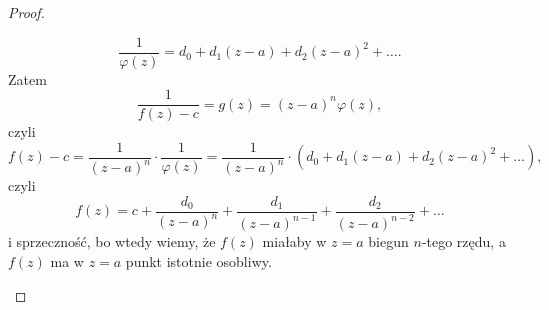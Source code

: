 \documentclass[../main.tex]{subfiles}
\begin{document}
\begin{proof}
\begin{enumerate}[\textit{i})]
        \[
            \frac{1}{\varphi(z)} = d_0 + d_1(z-a) + d_2(z-a)^2 + \ldots
        .\]
    Zatem
        \[
            \frac{1}{f(z) - c} = g(z) = (z-a)^n\varphi(z)
        ,\]
    czyli
        \[
            f(z) - c = \frac{1}{(z-a)^n}\cdot \frac{1}{\varphi(z)} = \frac{1}{(z-a)^n}\cdot \left( d_0 + d_1(z-a) + d_2(z-a)^2 + \ldots \right)
        ,\]
    czyli
        \[
            f(z) = c + \frac{d_0}{(z-a)^n} + \frac{d_1}{(z-a)^{n-1}} + \frac{d_2}{(z-a)^{n-2}} + \ldots
        \]
        i sprzeczność, bo wtedy wiemy, że $f(z)$ miałaby w $z = a$ biegun $n$-tego rzędu, a $f(z)$ ma w $z = a$ punkt istotnie osobliwy.

\end{enumerate}

\end{proof}
\end{document}
